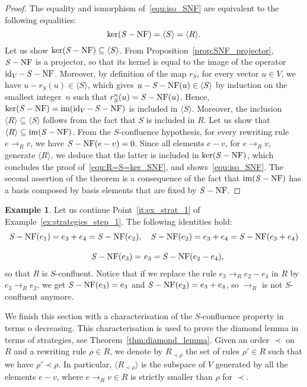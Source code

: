 \documentclass[11pt]{article}
\theoremstyle{definition}
\newtheorem{example}[theorem]{Example}
\newcommand\Rrho{R_{\prec\rho}}
\DeclareMathOperator{\id}{id}
\newcommand\Span[1]{\langle #1\rangle}
\DeclareMathOperator{\im}{im}
\newcommand\rewR{\to_R}
\DeclareMathOperator{\SNF}{{\it S}-NF}
\begin{document}
\begin{proof} 
  The equality and ismorphism of~\eqref{equ:iso_SNF} are equivalent to 
  the following equalities:
  \begin{equation}\label{equ:R=S=ker_SNF}
    \ker(\SNF)=\Span{S}=\Span{R}.
  \end{equation}
  Let us show $\ker(\SNF)\subseteq\Span{S}$. From
  Proposition~\ref{prop:SNF_projector}, $\SNF$ is a projector, so
  that its kernel is equal to the image of the operator $\id_V-\SNF$.
  Moreover, by definition of the map $r_S$, for every vector $u\in V$, we
  have $u-r_S(u)\in\Span{S}$, which gives $u-\SNF(u)\in\Span{S}$ by
  induction on the smallest integer~$n$ such that $r_S^n(u)=\SNF(u)$.
  Hence, $\ker(\SNF)=\im(\id_V-\SNF)$ is included in $\Span{S}$.
  Moreover, the inclusion $\Span{R}\subseteq\Span{S}$ follows from the
  fact that $S$ is included in $R$. Let us show that
  $\Span{R}\subseteq\im(\SNF)$. From the $S$-confluence hypothesis, for
  every rewriting rule $e\rewR v$, we have $\SNF(e-v)=0$. Since all
  elements $e-v$, for $e\rewR v$, generate $\Span{R}$, we  deduce that
  the latter is included in $\ker(\SNF)$, which concludes the proof 
  of~\eqref{equ:R=S=ker_SNF}, and shows~\eqref{equ:iso_SNF}. The second
  assertion of the theorem is a consequence of the fact that $\im(\SNF)$
  has a basis composed by basis elements that are fixed by $\SNF$.
\end{proof}
\smallskip

\begin{example}\label{ex:S-conf}
  Let us continue Point~\ref{it:ex_strat_1} of
  Example~\ref{ex:strategies_step_1}. The following identities hold:
  \[\begin{split}
  \SNF(e_1)=e_3+e_4=\SNF(e_2),&\quad\SNF(e_2)=e_3+e_4=\SNF(e_3+e_4)
  \\[0.3cm]
  \SNF(e_3)=& \ e_3=\SNF(e_2-e_4),
  \end{split}
  \smallskip\]
  so that $R$ is $S$-confluent. Notice that if we replace the rule
  $e_3\rewR e_2-e_4$ in $R$ by $e_3\rewR e_2$, we get $\SNF(e_3)=e_3$ and
  $\SNF(e_2)=e_3+e_4$, so $\rewR$ is not $S$-confluent anymore. 
\end{example}
\smallskip

We finish this section with a characterisation of the $S$-confluence
property in terms o decreasing. This characterisation is used to prove
the diamond lemma in terms of strategies, see
Theorem~\ref{thm:diamond_lemma}. Given an order $\prec$ on $R$ and a
rewriting rule $\rho\in R$, we denote by $\Rrho$ the set of rules
$\rho'\in R$ such that we have $\rho'\prec\rho$. In particular,
$\Span{\Rrho}$ is the subspace of $V$ generated by all the elements
$e-v$, where $e\rewR v\in R$ is strictly smaller than $\rho$ for $\prec$.
\smallskip
\end{document}
